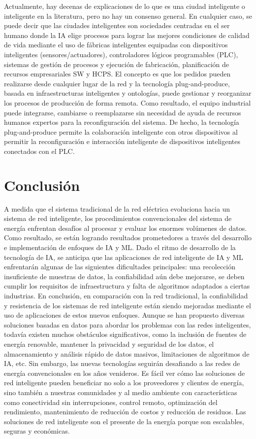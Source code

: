 \documentclass[crop=false]{standalone}
\begin{document}
Actualmente, hay decenas de explicaciones de lo que es una ciudad inteligente o inteligente en la literatura, pero no hay un consenso general. En cualquier caso, se puede decir que las ciudades inteligentes son sociedades centradas en el ser humano donde la IA elige procesos para lograr las mejores condiciones de calidad de vida mediante el uso de fábricas inteligentes equipadas con dispositivos inteligentes (sensores/actuadores), controladores lógicos programables (PLC), sistemas de gestión de procesos y ejecución de fabricación, planificación de recursos empresariales SW y HCPS.
El concepto es que los pedidos pueden realizarse desde cualquier lugar de la red y la tecnología plug-and-produce, basada en infraestructuras inteligentes y ontologías, puede gestionar y reorganizar los procesos de producción de forma remota. Como resultado, el equipo industrial puede integrarse, cambiarse o reemplazarse sin necesidad de ayuda de recursos humanos expertos para la reconfiguración del sistema. De hecho, la tecnología plug-and-produce permite la colaboración inteligente con otros dispositivos al permitir la reconfiguración e interacción inteligente de dispositivos inteligentes conectados con el PLC.

\section{Conclusión}

A medida que el sistema tradicional de la red eléctrica evoluciona hacia un sistema de red inteligente, los procedimientos convencionales del sistema de energía enfrentan desafíos al procesar y evaluar los enormes volúmenes de datos. Como resultado, se están logrando resultados prometedores a través del desarrollo e implementación de enfoques de IA y ML.
Dado el ritmo de desarrollo de la tecnología de IA, se anticipa que las aplicaciones de red inteligente de IA y ML enfrentarán algunas de las siguientes dificultades principales: una recolección insuficiente de muestras de datos, la confiabilidad aún debe mejorarse, se deben cumplir los requisitos de infraestructura y falta de algoritmos adaptados a ciertas industrias.
En conclusión, en comparación con la red tradicional, la confiabilidad y resistencia de los sistemas de red inteligente están siendo mejoradas mediante el uso de aplicaciones de estos nuevos enfoques. Aunque se han propuesto diversas soluciones basadas en datos para abordar los problemas con las redes inteligentes, todavía existen muchos obstáculos significativos, como la inclusión de fuentes de energía renovable, mantener la privacidad y seguridad de los datos, el almacenamiento y análisis rápido de datos masivos, limitaciones de algoritmos de IA, etc.
Sin embargo, las nuevas tecnologías seguirán desafiando a las redes de energía convencionales en los años venideros. Es fácil ver cómo las soluciones de red inteligente pueden beneficiar no solo a los proveedores y clientes de energía, sino también a nuestras comunidades y al medio ambiente con características como conectividad sin interrupciones, control remoto, optimización del rendimiento, mantenimiento de reducción de costos y reducción de residuos. Las soluciones de red inteligente son el presente de la energía porque son escalables, seguras y económicas.
\end{document}
